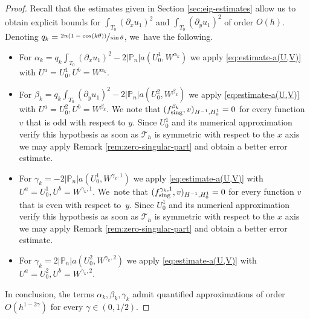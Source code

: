 \documentclass[JEP,XML,SOM,Unicode,ThmDefs,NoFloatCountersInSection,published]{cedram}
\theoremstyle{plain}
\theoremstyle{definition}
\newcommand{\sing}{\textup{sing}}
\def\Pp{{\mathbb{P}_n}}
\begin{document}
\skpt
\begin{proof}
Recall that the estimates given in Section \ref{sec:eig-estimates} allow us to obtain explicit bounds for $\int_{T_0}(\partial_x u_1)^2$ and $\int_{T_0} (\partial_y u_1)^2$ of order $O(h)$. Denoting \hbox{$q_k = \sfrac{2n(1-\cos(k\theta))}{\sin \theta}$}, we~have the following.
\begin{itemize}
\item For $\alpha_k = q_k\int_{T_0}(\partial_x u_1)^2-2|\Pp| a(U_0^1,W^{\alpha_k})$ we apply \eqref{eq:estimate-a(U,V)} with $U^a = U_0^1,U^b = W^{\alpha_k}$.
\item For $\beta_k = q_k\int_{T_0}(\partial_y u_1)^2-2|\Pp| a(U_0^2,W^{\beta_k})$ we apply \eqref{eq:estimate-a(U,V)} with $U^a = U_0^2,U^b = W^{\beta_k}$. We note that $(f_{\sing}^{\beta_k},v)_{H^{-1},H_0^1} = 0$ for every function $v$ that is odd with respect to $y$. Since $U_0^1$ and its numerical approximation verify this hypothesis as soon as $\mathcal T_h$ is symmetric with respect to the $x$ axis we may apply Remark \ref{rem:zero-singular-part} and obtain a better error estimate.
\item For $\gamma_k = -2|\Pp|a(U_0^1,W^{\gamma_k,1})$ we apply \eqref{eq:estimate-a(U,V)} with $U^a = U_0^1, U^b = W^{\gamma_k,1}$. We~note that $(f_{\sing}^{\gamma_k,1},v)_{H^{-1},H_0^1} = 0$ for every function $v$ that is even with respect to~$y$. Since $U_0^1$ and its numerical approximation verify this hypothesis as soon as $\mathcal T_h$ is symmetric with respect to the $x$ axis we may apply Remark \ref{rem:zero-singular-part} and obtain a better error estimate.
\item For $\gamma_k = 2|\Pp| a(U_0^2,W^{\gamma_k,2})$ we apply \eqref{eq:estimate-a(U,V)} with $U^a = U_0^2, U^b = W^{\gamma_k,2}$.
\end{itemize}
In conclusion, the terms $\alpha_k,\beta_k,\gamma_k$ admit quantified approximations of order $O(h^{1-2\gamma})$ for every $\gamma \in (0,1/2)$.
\end{proof}
\end{document}
